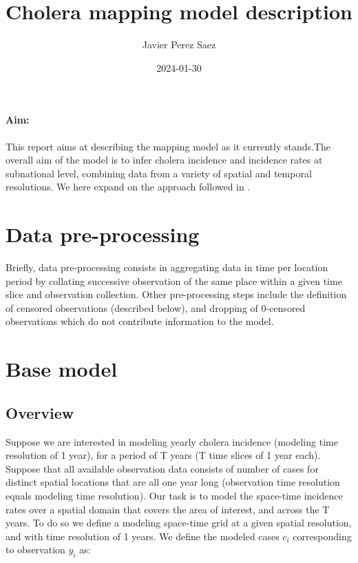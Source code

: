 \documentclass[
]{article}
\title{Cholera mapping model description}
\author{Javier Perez Saez}
\date{2024-01-30}
\begin{document}
\maketitle

{
\setcounter{tocdepth}{2}
\tableofcontents
}
\paragraph*{Aim:}

This report aims at describing the mapping model as it currently stands.The overall aim of the model is to infer cholera incidence and incidence rates at subnational level, combining data from a variety of spatial and temporal resolutions. We here expand on the approach followed in \textcite{Lessler2018}.

\hypertarget{data-pre-processing}{%
\section{Data pre-processing}\label{data-pre-processing}}

Briefly, data pre-processing consists in aggregating data in time per location period by collating successive observation of the same place within a given time slice and observation collection. Other pre-processing steps include the definition of censored observations (described below), and dropping of 0-censored observations which do not contribute information to the model.

\hypertarget{base-model}{%
\section{Base model}\label{base-model}}

\hypertarget{overview}{%
\subsection{Overview}\label{overview}}

Suppose we are interested in modeling yearly cholera incidence (modeling time resolution of 1 year), for a period of T years (T time slices of 1 year each). Suppose that all available observation data consists of number of cases for distinct spatial locations that are all one year long (observation time resolution equals modeling time resolution). Our task is to model the space-time incidence rates over a spatial domain that covers the area of interest, and across the T years. To do so we define a modeling space-time grid at a given spatial resolution, and with time resolution of 1 years. We define the modeled cases \(c_i\) corresponding to observation \(y_i\) as:
\end{document}
